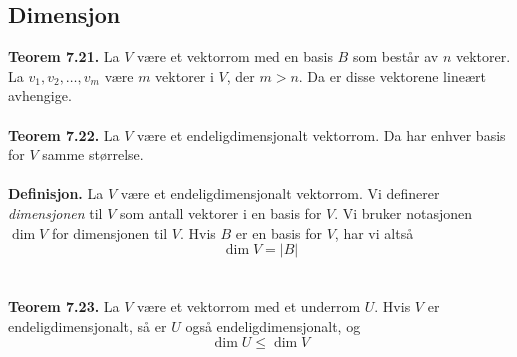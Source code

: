 \documentclass{article}
\begin{document}
\subsection{Dimensjon}
\textbf{Teorem 7.21.} La $V$ være et vektorrom med en basis $B$ som består av $n$ vektorer. La $v_1, v_2, \dots, v_m$ være $m$ vektorer i $V$, der $m > n$. Da er disse vektorene lineært avhengige.
\\\\
\textbf{Teorem 7.22.} La $V$ være et endeligdimensjonalt vektorrom. Da har enhver basis for $V$ samme størrelse.
\\\\
\textbf{Definisjon.} La $V$ være et endeligdimensjonalt vektorrom. Vi definerer \textit{dimensjonen} til $V$ som antall vektorer i en basis for $V$. Vi bruker notasjonen $\dim{V}$ for dimensjonen til $V$. Hvis $B$ er en basis for $V$, har vi altså
\[ \dim{V} = |B| \]
\\\\
\textbf{Teorem 7.23.} La $V$ være et vektorrom med et underrom $U$. Hvis $V$ er endeligdimensjonalt, så er $U$ også endeligdimensjonalt, og
\[ \dim{U} \leq \dim{V} \]
\end{document}
